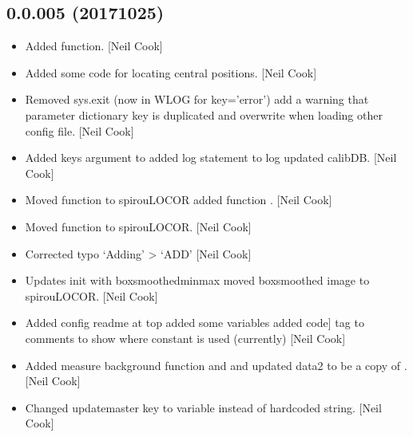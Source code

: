 \documentclass[a4paper,10pt,english]{report}
\begin{document}
\subsection{0.0.005 (2017\sphinxhyphen{}10\sphinxhyphen{}25)}
\label{\detokenize{misc/changelog:id564}}\begin{itemize}
\item {} 
Added  function. {[}Neil Cook{]}

\item {} 
Added some code for locating central positions. {[}Neil Cook{]}

\item {} 
Removed sys.exit (now in WLOG for key=’error’) add a warning that
parameter dictionary key is duplicated and overwrite when loading
other config file. {[}Neil Cook{]}

\item {} 
Added keys argument to  added log statement to log
updated calibDB. {[}Neil Cook{]}

\item {} 
Moved  function to spirouLOCOR added function
. {[}Neil Cook{]}

\item {} 
Moved  function to spirouLOCOR. {[}Neil Cook{]}

\item {} 
Corrected typo ‘Adding’ \textendash{}\textgreater{} ‘ADD’ {[}Neil Cook{]}

\item {} 
Updates init with boxsmoothedminmax moved boxsmoothed image to
spirouLOCOR. {[}Neil Cook{]}

\item {} 
Added config readme at top added some  variables added \sphinxhyphen{}{[}code{]}
tag to comments to show where constant is used (currently) {[}Neil Cook{]}

\item {} 
Added measure background function and  and
 updated data2 to be a copy of
. {[}Neil Cook{]}

\item {} 
Changed updatemaster key to variable instead of hardcoded string.
{[}Neil Cook{]}


\end{itemize}
\end{document}
